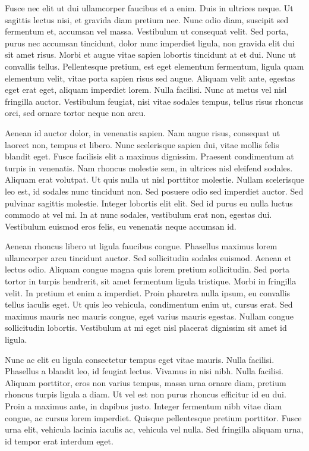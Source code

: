 Fusce nec elit ut dui ullamcorper faucibus et a enim. Duis in ultrices neque. Ut sagittis lectus nisi, et gravida diam pretium nec. Nunc odio diam, suscipit sed fermentum et, accumsan vel massa. Vestibulum ut consequat velit. Sed porta, purus nec accumsan tincidunt, dolor nunc imperdiet ligula, non gravida elit dui sit amet risus. Morbi et augue vitae sapien lobortis tincidunt at et dui. Nunc ut convallis tellus. Pellentesque pretium, est eget elementum fermentum, ligula quam elementum velit, vitae porta sapien risus sed augue. Aliquam velit ante, egestas eget erat eget, aliquam imperdiet lorem. Nulla facilisi. Nunc at metus vel nisl fringilla auctor. Vestibulum feugiat, nisi vitae sodales tempus, tellus risus rhoncus orci, sed ornare tortor neque non arcu.

Aenean id auctor dolor, in venenatis sapien. Nam augue risus, consequat ut laoreet non, tempus et libero. Nunc scelerisque sapien dui, vitae mollis felis blandit eget. Fusce facilisis elit a maximus dignissim. Praesent condimentum at turpis in venenatis. Nam rhoncus molestie sem, in ultrices nisl eleifend sodales. Aliquam erat volutpat. Ut quis nulla ut nisl porttitor molestie. Nullam scelerisque leo est, id sodales nunc tincidunt non. Sed posuere odio sed imperdiet auctor. Sed pulvinar sagittis molestie. Integer lobortis elit elit. Sed id purus eu nulla luctus commodo at vel mi. In at nunc sodales, vestibulum erat non, egestas dui. Vestibulum euismod eros felis, eu venenatis neque accumsan id.

Aenean rhoncus libero ut ligula faucibus congue. Phasellus maximus lorem ullamcorper arcu tincidunt auctor. Sed sollicitudin sodales euismod. Aenean et lectus odio. Aliquam congue magna quis lorem pretium sollicitudin. Sed porta tortor in turpis hendrerit, sit amet fermentum ligula tristique. Morbi in fringilla velit. In pretium et enim a imperdiet. Proin pharetra nulla ipsum, eu convallis tellus iaculis eget. Ut quis leo vehicula, condimentum enim ut, cursus erat. Sed maximus mauris nec mauris congue, eget varius mauris egestas. Nullam congue sollicitudin lobortis. Vestibulum at mi eget nisl placerat dignissim sit amet id ligula.

Nunc ac elit eu ligula consectetur tempus eget vitae mauris. Nulla facilisi. Phasellus a blandit leo, id feugiat lectus. Vivamus in nisi nibh. Nulla facilisi. Aliquam porttitor, eros non varius tempus, massa urna ornare diam, pretium rhoncus turpis ligula a diam. Ut vel est non purus rhoncus efficitur id eu dui. Proin a maximus ante, in dapibus justo. Integer fermentum nibh vitae diam congue, ac cursus lorem imperdiet. Quisque pellentesque pretium porttitor. Fusce urna elit, vehicula lacinia iaculis ac, vehicula vel nulla. Sed fringilla aliquam urna, id tempor erat interdum eget.

